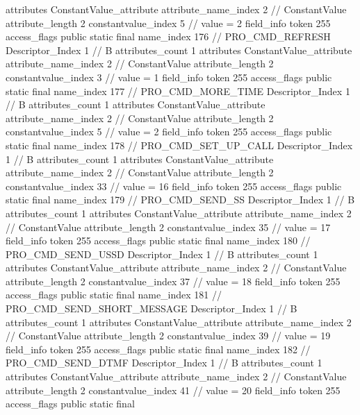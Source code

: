 {{{{{				attributes {
				ConstantValue_attribute {
					attribute_name_index	2		// ConstantValue
					attribute_length	2
					constantvalue_index	5		// value = 2
				}
				}
			}
			field_info {
				token	255
				access_flags	public static final
				name_index	176		// PRO_CMD_REFRESH
				Descriptor_Index	1		// B
				attributes_count	1
				attributes {
				ConstantValue_attribute {
					attribute_name_index	2		// ConstantValue
					attribute_length	2
					constantvalue_index	3		// value = 1
				}
				}
			}
			field_info {
				token	255
				access_flags	public static final
				name_index	177		// PRO_CMD_MORE_TIME
				Descriptor_Index	1		// B
				attributes_count	1
				attributes {
				ConstantValue_attribute {
					attribute_name_index	2		// ConstantValue
					attribute_length	2
					constantvalue_index	5		// value = 2
				}
				}
			}
			field_info {
				token	255
				access_flags	public static final
				name_index	178		// PRO_CMD_SET_UP_CALL
				Descriptor_Index	1		// B
				attributes_count	1
				attributes {
				ConstantValue_attribute {
					attribute_name_index	2		// ConstantValue
					attribute_length	2
					constantvalue_index	33		// value = 16
				}
				}
			}
			field_info {
				token	255
				access_flags	public static final
				name_index	179		// PRO_CMD_SEND_SS
				Descriptor_Index	1		// B
				attributes_count	1
				attributes {
				ConstantValue_attribute {
					attribute_name_index	2		// ConstantValue
					attribute_length	2
					constantvalue_index	35		// value = 17
				}
				}
			}
			field_info {
				token	255
				access_flags	public static final
				name_index	180		// PRO_CMD_SEND_USSD
				Descriptor_Index	1		// B
				attributes_count	1
				attributes {
				ConstantValue_attribute {
					attribute_name_index	2		// ConstantValue
					attribute_length	2
					constantvalue_index	37		// value = 18
				}
				}
			}
			field_info {
				token	255
				access_flags	public static final
				name_index	181		// PRO_CMD_SEND_SHORT_MESSAGE
				Descriptor_Index	1		// B
				attributes_count	1
				attributes {
				ConstantValue_attribute {
					attribute_name_index	2		// ConstantValue
					attribute_length	2
					constantvalue_index	39		// value = 19
				}
				}
			}
			field_info {
				token	255
				access_flags	public static final
				name_index	182		// PRO_CMD_SEND_DTMF
				Descriptor_Index	1		// B
				attributes_count	1
				attributes {
				ConstantValue_attribute {
					attribute_name_index	2		// ConstantValue
					attribute_length	2
					constantvalue_index	41		// value = 20
				}
				}
			}
			field_info {
				token	255
				access_flags	public static final
}}}}}
